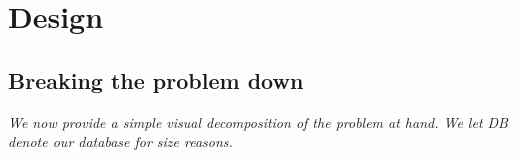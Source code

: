 \pagestyle{fancy}
\chead{\sffamily \thepage}

\usetikzlibrary{positioning}

\chapter{Design}

\section{Breaking the problem down}
\label{sec:breakdown}

\textit
{
We now provide a simple visual decomposition of the problem at 
hand. We let DB denote our database for size reasons.
}

